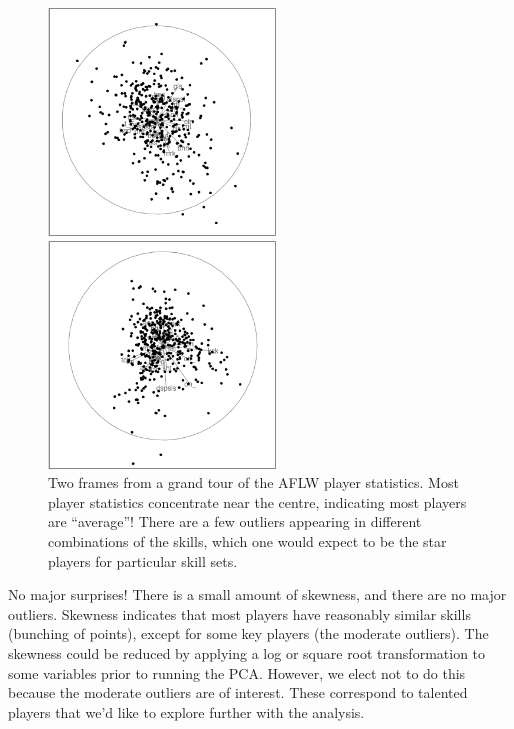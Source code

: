 \documentclass[
  letterpaper,
]{krantz}
\begin{document}
\begin{figure}

\begin{minipage}{0.50\linewidth}
\includegraphics[width=2.375in,height=\textheight]{images/aflw_gt_70.png}\end{minipage}%
%
\begin{minipage}{0.50\linewidth}
\includegraphics[width=2.375in,height=\textheight]{images/aflw_gt_329.png}\end{minipage}%

\caption{\label{fig-aflw-gt-pdf}Two frames from a grand tour of the AFLW
player statistics. Most player statistics concentrate near the centre,
indicating most players are ``average''! There are a few outliers
appearing in different combinations of the skills, which one would
expect to be the star players for particular skill sets.}

\end{figure}%

No major surprises! There is a small amount of skewness, and there are
no major outliers. Skewness indicates that most players have reasonably
similar skills (bunching of points), except for some key players (the
moderate outliers). The skewness could be reduced by applying a log or
square root transformation to some variables prior to running the PCA.
However, we elect not to do this because the moderate outliers are of
interest. These correspond to talented players that we'd like to explore
further with the analysis.
\end{document}
